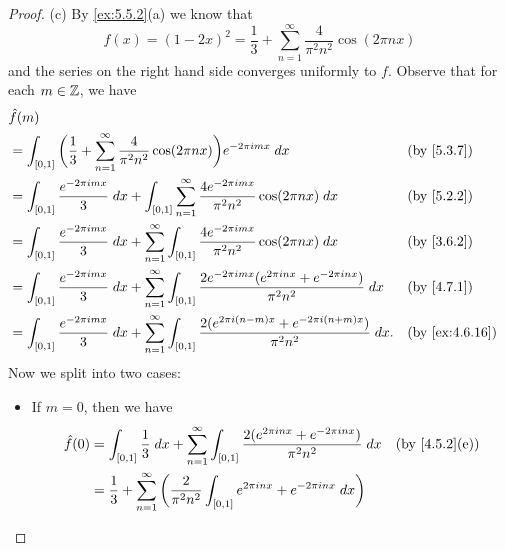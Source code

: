 \begin{proof}{(c)}
  By \cref{ex:5.5.2}(a) we know that
  \[
    f(x) = (1 - 2x)^2 = \dfrac{1}{3} + \sum_{n = 1}^\infty \dfrac{4}{\pi^2 n^2} \cos(2 \pi n x)
  \]
  and the series on the right hand side converges uniformly to \(f\).
  Observe that for each \(m \in \mathbb{Z}\), we have
  \begin{align*}
     & \hat{f}(m)                                                                                                                                                                                                  \\
     & = \int_{[0, 1]} \bigg(\dfrac{1}{3} + \sum_{n = 1}^\infty \dfrac{4}{\pi^2 n^2} \cos(2 \pi n x)\bigg) e^{-2 \pi i m x} \; dx                                                &  & \by{5.3.7}                   \\
     & = \int_{[0, 1]} \dfrac{e^{- 2 \pi i m x}}{3} \; dx + \int_{[0, 1]} \sum_{n = 1}^\infty \dfrac{4 e^{- 2 \pi i m x}}{\pi^2 n^2} \cos(2 \pi n x) \; dx                       &  & \by{5.2.2}                   \\
     & = \int_{[0, 1]} \dfrac{e^{- 2 \pi i m x}}{3} \; dx + \sum_{n = 1}^\infty \int_{[0, 1]} \dfrac{4 e^{- 2 \pi i m x}}{\pi^2 n^2} \cos(2 \pi n x) \; dx                       &  & \by{3.6.2}                   \\
     & = \int_{[0, 1]} \dfrac{e^{- 2 \pi i m x}}{3} \; dx + \sum_{n = 1}^\infty \int_{[0, 1]} \dfrac{2 e^{- 2 \pi i m x} (e^{2 \pi i n x} + e^{- 2 \pi i n x})}{\pi^2 n^2} \; dx &  & \by{4.7.1}                   \\
     & = \int_{[0, 1]} \dfrac{e^{- 2 \pi i m x}}{3} \; dx + \sum_{n = 1}^\infty \int_{[0, 1]} \dfrac{2 (e^{2 \pi i (n - m) x} + e^{- 2 \pi i (n + m) x})}{\pi^2 n^2} \; dx.      &  & \text{(by \cref{ex:4.6.16})}
  \end{align*}
  Now we split into two cases:
  \begin{itemize}
    \item If \(m = 0\), then we have
          \begin{align*}
            \hat{f}(0) & = \int_{[0, 1]} \dfrac{1}{3} \; dx + \sum_{n = 1}^\infty \int_{[0, 1]} \dfrac{2 (e^{2 \pi i n x} + e^{- 2 \pi i n x})}{\pi^2 n^2} \; dx &  & \text{(by \cref{4.5.2}(e))} \\
                       & = \dfrac{1}{3} + \sum_{n = 1}^\infty \bigg(\dfrac{2}{\pi^2 n^2} \int_{[0, 1]} e^{2 \pi i n x} + e^{- 2 \pi i n x} \; dx\bigg)                                            \\

\end{align*}
\end{itemize}
\end{proof}
